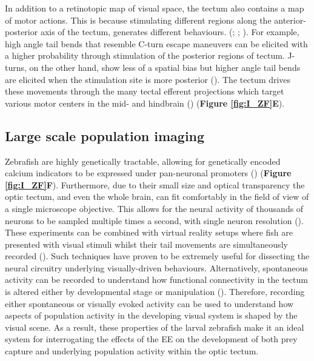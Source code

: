 In addition to a retinotopic map of visual space, the tectum also contains a map of motor actions. This is because stimulating different regions along the anterior-posterior axis of the tectum, generates different behaviours. (\cite{Herrero1998TailGoldfish}; \cite{Helmbrecht2018}; \cite{Fajardo2013ControlZebrafish.}). For example, high angle tail bends that resemble C-turn escape maneuvers can be elicited with a higher probability through stimulation of the posterior regions of tectum. J-turns, on the other hand, show less of a spatial bias but higher angle tail bends are elicited when the stimulation site is more posterior (\cite{Helmbrecht2018}). The tectum drives these movements through the many tectal efferent projections which target various motor centers in the mid- and hindbrain  (\cite{Helmbrecht2018}) (\textbf{Figure \ref{fig:I_ZF}E}). 

\subsection{Large scale population imaging}
Zebrafish are highly genetically tractable, allowing for genetically encoded calcium indicators to be expressed under pan-neuronal promoters (\cite{Kim2014ProlongedMapping}) (\textbf{Figure \ref{fig:I_ZF}F}). Furthermore, due to their small size and optical transparency the optic tectum, and even the whole brain, can fit comfortably in the field of view of a single microscope objective. This allows for the neural activity of thousands of neurons to be sampled multiple times a second, with single neuron resolution (\cite{Ahrens2013,Bianco2015,Portugues2014}). These experiments can be combined with virtual reality setups where fish are presented with visual stimuli whilst their tail movements are simultaneously recorded (\cite{Bianco2015, Semmelhack2014, Naumann2016FromResponse, Portugues2014}). Such techniques have proven to be extremely useful for dissecting the neural circuitry underlying visually-driven behaviours. Alternatively, spontaneous activity can be recorded to understand how functional connectivity in the tectum is altered either by developmental stage or manipulation (\cite{Avitan2017, Pietri2017}). Therefore, recording either spontaneous or visually evoked activity can be used to understand how aspects of population activity in the developing visual system is shaped by the visual scene. As a result, these properties of the larval zebrafish make it an ideal system for interrogating the effects of the EE on the development of both prey capture and underlying population activity within the optic tectum. 

